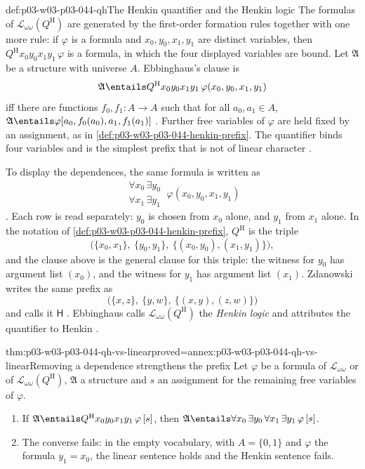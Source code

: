 \begin{hbdefinition}{def:p03-w03-p03-044-qh}{The Henkin quantifier and the Henkin logic}
The formulas of \(\mathscr L_{\omega\omega}(Q^{\mathrm H})\) are generated
by the first-order formation rules together with one more rule: if
\(\varphi\) is a formula and \(x_0,y_0,x_1,y_1\) are distinct variables, then
\(Q^{\mathrm H}x_0y_0x_1y_1\,\varphi\) is a formula, in which the four
displayed variables are bound.  Let \(\mathfrak A\) be a structure with
universe \(A\).  Ebbinghaus's clause is
\[
 \mathfrak A\entails Q^{\mathrm H}x_0y_0x_1y_1\,
   \varphi(x_0,y_0,x_1,y_1)
\]
iff there are functions \(f_0,f_1:A\to A\) such that for all
\(a_0,a_1\in A\),
\(\mathfrak A\entails\varphi[a_0,f_0(a_0),a_1,f_1(a_1)]\)
\cite[p.~38]{Ebbinghaus1985ExtendedLogics}.  Further free variables of
\(\varphi\) are held fixed by an assignment, as in
\cref{def:p03-w03-p03-044-henkin-prefix}.  The quantifier binds four
variables and is the simplest prefix that is not of linear character
\cite[p.~38]{Ebbinghaus1985ExtendedLogics}.

To display the dependences, the same formula is written as
\[
 \begin{matrix}\forall x_0\,\exists y_0\\ \forall x_1\,\exists y_1\end{matrix}
 \ \varphi(x_0,y_0,x_1,y_1)
\]
\cite[p.~39]{Ebbinghaus1985ExtendedLogics}.  Each row is read separately:
\(y_0\) is chosen from \(x_0\) alone, and \(y_1\) from \(x_1\) alone.  In
the notation of \cref{def:p03-w03-p03-044-henkin-prefix}, \(Q^{\mathrm H}\)
is the triple
\[
 \bigl(\{x_0,x_1\},\ \{y_0,y_1\},\ \{(x_0,y_0),(x_1,y_1)\}\bigr),
\]
and the clause above is the general clause for this triple: the witness
for \(y_0\) has argument list \((x_0)\), and the witness for \(y_1\) has
argument list \((x_1)\).  Zdanowski writes the same prefix as
\[
 \bigl(\{x,z\},\ \{y,w\},\ \{(x,y),(z,w)\}\bigr)
\]
and calls it \(\mathsf H\) \cite[p.~2]{Zdanowski2016HenkinArxiv}.  Ebbinghaus calls
\(\mathscr L_{\omega\omega}(Q^{\mathrm H})\) the \emph{Henkin logic} and
attributes the quantifier to Henkin \cite[p.~38]{Ebbinghaus1985ExtendedLogics}.
\end{hbdefinition}

\begin{hbtheorem}{thm:p03-w03-p03-044-qh-vs-linear}{proved=annex:p03-w03-p03-044-qh-vs-linear}{Removing a dependence strengthens the prefix}
Let \(\varphi\) be a formula of \(\mathscr L_{\omega\omega}\) or of
\(\mathscr L_{\omega\omega}(Q^{\mathrm H})\), \(\mathfrak A\) a structure and
\(s\) an assignment for the remaining free variables of \(\varphi\).
\begin{enumerate}
 \item If \(\mathfrak A\entails Q^{\mathrm H}x_0y_0x_1y_1\,\varphi\,[s]\),
       then \(\mathfrak A\entails\forall x_0\,\exists y_0\,\forall x_1\,
       \exists y_1\,\varphi\,[s]\).
 \item The converse fails: in the empty vocabulary, with
       \(A=\{0,1\}\) and \(\varphi\) the formula \(y_1=x_0\), the linear
       sentence holds and the Henkin sentence fails.
\end{enumerate}
\end{hbtheorem}

